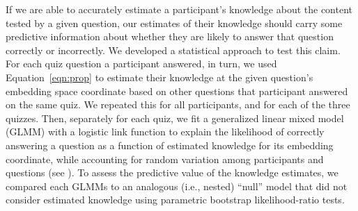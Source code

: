 \documentclass[10pt]{article}
\renewcommand{\nameref}[1]{\mbox{\textit{\oldnameref{#1}}}}
\begin{document}
If we are able to accurately estimate a participant's knowledge about the
content tested by a given question, our estimates of their knowledge should
carry some predictive information about whether they are likely to answer that
question correctly or incorrectly. We developed a statistical approach to test
this claim. For each quiz question a participant answered, in turn, we used
Equation~\ref{eqn:prop} to estimate their knowledge at the given question's
embedding space coordinate based on other questions that participant answered
on the same quiz. We repeated this for all participants, and for each of the
three quizzes. Then, separately for each quiz, we fit a generalized linear
mixed model (GLMM) with a logistic link function to explain the likelihood of
correctly answering a question as a function of estimated knowledge for its
embedding coordinate, while accounting for random variation among participants
and questions (see \nameref{subsec:glmm}). To assess the predictive value of
the knowledge estimates, we compared each GLMMs to an analogous (i.e., nested)
``null'' model that did not consider estimated knowledge using parametric
bootstrap likelihood-ratio tests.
\end{document}
